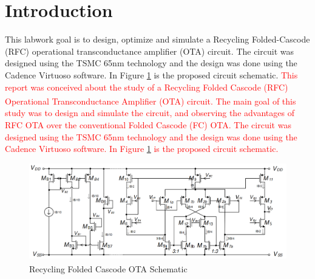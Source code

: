 \section{Introduction}

This labwork goal is to design, optimize and simulate a Recycling Folded-Cascode (RFC) operational transconductance amplifier (OTA) circuit{\cite{artigo-prof}}.
The circuit was designed using the TSMC 65nm technology and the design was done using the Cadence Virtuoso software. In Figure \ref{fig:OTA_schematic} is the proposed circuit schematic.
\textcolor{red}{
This report was conceived about the study of a Recycling Folded Cascode (RFC) Operational Transconductance Amplifier (OTA) circuit\textsuperscript{\cite{artigo-prof}}. The main goal of this study was to design and simulate the circuit, and observing the advantages of RFC OTA over the conventional Folded Cascode (FC) OTA. 
The circuit was designed using the TSMC 65nm technology and the design was done using the Cadence Virtuoso software. In Figure \ref{fig:OTA_schematic} is the proposed circuit schematic.
}
\begin{figure}[H]
    \centering
    \includegraphics[width=1\textwidth]{Images/RFC_OTA_schematic.png}
    \caption{Recycling Folded Cascode OTA Schematic\textsuperscript{\cite{Lab-statement}}}
    \label{fig:OTA_schematic}
\end{figure}

